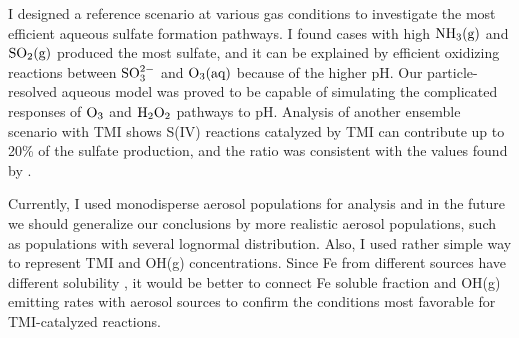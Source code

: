\documentclass[edeposit,fullpage]{uiucthesis2009}
\begin{document}
I designed a reference scenario at various gas conditions to investigate the most efficient aqueous sulfate formation pathways.
I found cases with high $\rm NH_3(g)$ and $\rm SO_2(g)$ produced the most sulfate, and it can be explained by efficient oxidizing reactions between $\rm SO_3^{2-}$ and $\rm O_3(aq)$ because of the higher pH. Our particle-resolved aqueous model was proved to be capable of simulating the complicated responses of $\rm O_3$ and $\rm H_2O_2$ pathways to pH. Analysis of another ensemble scenario with TMI shows S(IV) reactions catalyzed by TMI can contribute up to 20\% of the sulfate production, and the ratio was consistent with the values found by \citet{alexander2009transition}. 

Currently, I used monodisperse aerosol populations for analysis and in the future we should generalize our conclusions by more realistic aerosol populations, such as populations with several lognormal distribution. Also, I used rather simple way to represent TMI and OH(g) concentrations. Since Fe from different sources have different solubility \citep{desboeufs2005dissolution}, it would be better to connect Fe soluble fraction and OH(g) emitting rates with aerosol sources to confirm the conditions most favorable for TMI-catalyzed reactions. 

\backmatter
\renewcommand{\bibname}{References}


\end{document}
